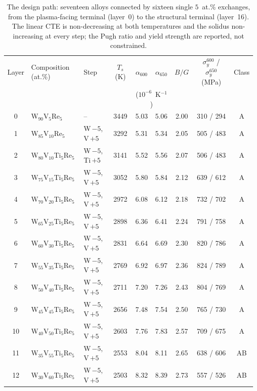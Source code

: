 \begin{table}[!t]
\centering
\caption{The design path: seventeen alloys connected by sixteen single
\(5\)~at.\% exchanges, from the plasma-facing terminal (layer~0) to the structural
terminal (layer~16). The linear CTE is non-decreasing at both temperatures and the solidus
non-increasing at every step; the Pugh ratio and yield strength are reported, not
constrained.}
\label{tab:path}
\begin{tabular}{cllcccccc}
\toprule
Layer & Composition (at.\%) & Step & \(T_s\) (K) & \(\alpha_{600}\) & \(\alpha_{650}\) & \(B/G\) & \(\sigma_y^{600}\) / \(\sigma_y^{650}\) (MPa) & Class \\
 & & & & \multicolumn{2}{c}{(\(10^{-6}\)~K\(^{-1}\))} & & & \\
\midrule
0  & W$_{90}$V$_{5}$Re$_{5}$         & --                  & 3449 & 5.03 & 5.06 & 2.00 & 310 / 294 & A \\
1  & W$_{85}$V$_{10}$Re$_{5}$        & W\,$-5$, V\,$+5$    & 3292 & 5.31 & 5.34 & 2.05 & 505 / 483 & A \\
2  & W$_{80}$V$_{10}$Ti$_{5}$Re$_{5}$ & W\,$-5$, Ti\,$+5$  & 3141 & 5.52 & 5.56 & 2.07 & 506 / 483 & A \\
3  & W$_{75}$V$_{15}$Ti$_{5}$Re$_{5}$ & W\,$-5$, V\,$+5$   & 3052 & 5.80 & 5.84 & 2.12 & 639 / 612 & A \\
4  & W$_{70}$V$_{20}$Ti$_{5}$Re$_{5}$ & W\,$-5$, V\,$+5$   & 2972 & 6.08 & 6.12 & 2.18 & 732 / 702 & A \\
5  & W$_{65}$V$_{25}$Ti$_{5}$Re$_{5}$ & W\,$-5$, V\,$+5$   & 2898 & 6.36 & 6.41 & 2.24 & 791 / 758 & A \\
6  & W$_{60}$V$_{30}$Ti$_{5}$Re$_{5}$ & W\,$-5$, V\,$+5$   & 2831 & 6.64 & 6.69 & 2.30 & 820 / 786 & A \\
7  & W$_{55}$V$_{35}$Ti$_{5}$Re$_{5}$ & W\,$-5$, V\,$+5$   & 2769 & 6.92 & 6.97 & 2.36 & 824 / 789 & A \\
8  & W$_{50}$V$_{40}$Ti$_{5}$Re$_{5}$ & W\,$-5$, V\,$+5$   & 2711 & 7.20 & 7.26 & 2.43 & 804 / 769 & A \\
9  & W$_{45}$V$_{45}$Ti$_{5}$Re$_{5}$ & W\,$-5$, V\,$+5$   & 2656 & 7.48 & 7.54 & 2.50 & 765 / 730 & A \\
10 & W$_{40}$V$_{50}$Ti$_{5}$Re$_{5}$ & W\,$-5$, V\,$+5$   & 2603 & 7.76 & 7.83 & 2.57 & 709 / 675 & A \\
11 & W$_{35}$V$_{55}$Ti$_{5}$Re$_{5}$ & W\,$-5$, V\,$+5$   & 2553 & 8.04 & 8.11 & 2.65 & 638 / 606 & AB \\
12 & W$_{30}$V$_{60}$Ti$_{5}$Re$_{5}$ & W\,$-5$, V\,$+5$   & 2503 & 8.32 & 8.39 & 2.73 & 557 / 526 & AB \\

\end{tabular}
\end{table}
